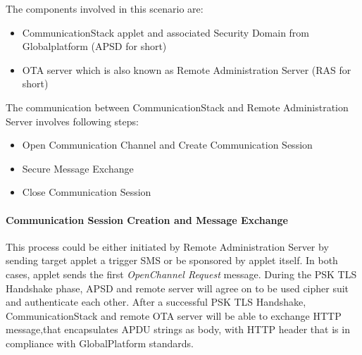 \documentclass[]{llncs}
\begin{document}
The components involved in this scenario are:
 \begin{itemize}
  \item CommunicationStack applet and associated Security Domain from Globalplatform (APSD  for short)
  \item OTA server which is also known as Remote Administration Server (RAS for short)
\end{itemize}

The communication between CommunicationStack and Remote Administration Server involves following  steps:

 \begin{itemize}
  \item Open Communication Channel and Create Communication Session
  \item Secure Message Exchange
  \item Close Communication Session
\end{itemize}
\paragraph{Communication Session Creation and Message Exchange}
This process could be either initiated by Remote Administration Server by sending target applet a trigger SMS or be sponsored by applet itself. In both cases, applet sends the first \emph{OpenChannel Request} message. During the PSK TLS Handshake phase, APSD and remote server will agree on to be used cipher suit and authenticate each other. After a successful PSK TLS Handshake, CommunicationStack and remote OTA server will be able to exchange HTTP message,that encapsulates APDU strings as body, with HTTP header that is in compliance with GlobalPlatform standards.
\end{document}
